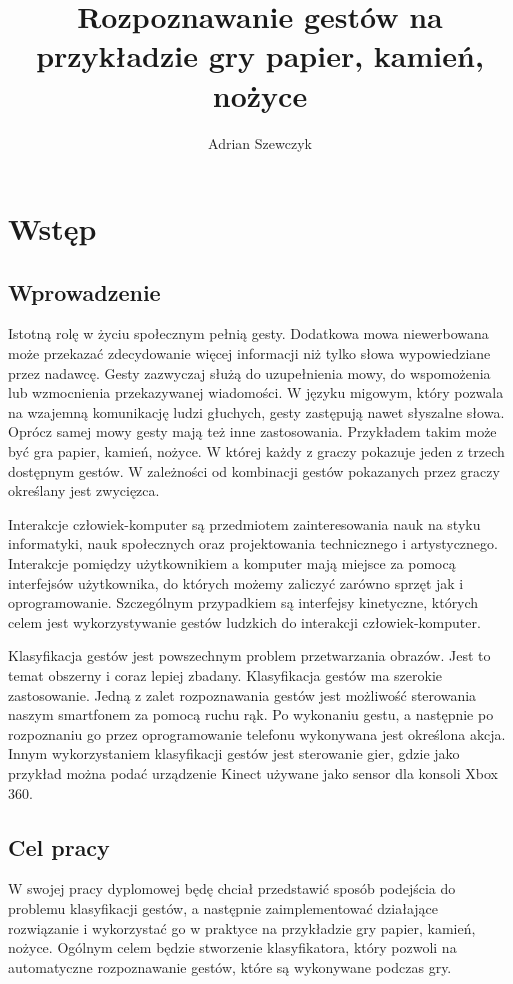\documentclass[a4paper,12pt,twoside,openany]{report}
\title{Rozpoznawanie gestów na przykładzie gry papier, kamień, nożyce}
\author{Adrian Szewczyk}
\begin{document}
\maketitle


\chapter{Wstęp}
\section{Wprowadzenie}
Istotną rolę w życiu społecznym pełnią gesty. Dodatkowa mowa niewerbowana może przekazać zdecydowanie więcej informacji niż tylko słowa wypowiedziane przez nadawcę. Gesty zazwyczaj służą do uzupełnienia mowy, do wspomożenia lub wzmocnienia przekazywanej wiadomości\cite{Collins}. W języku migowym, który pozwala na wzajemną komunikację ludzi głuchych, gesty zastępują nawet słyszalne słowa. Oprócz samej mowy gesty mają też inne zastosowania. Przykładem takim może być gra papier, kamień, nożyce. W której każdy z graczy pokazuje jeden z trzech dostępnym gestów. W zależności od kombinacji gestów pokazanych przez graczy określany jest zwycięzca.

Interakcje człowiek-komputer są przedmiotem zainteresowania nauk na styku informatyki, nauk społecznych oraz projektowania technicznego i artystycznego. Interakcje pomiędzy użytkownikiem a komputer mają miejsce za pomocą interfejsów użytkownika, do których możemy zaliczyć zarówno sprzęt jak i oprogramowanie\cite{Kostkiewicz}. Szczególnym przypadkiem są interfejsy kinetyczne, których celem jest wykorzystywanie gestów ludzkich do interakcji człowiek-komputer.

Klasyfikacja gestów jest powszechnym problem przetwarzania obrazów. Jest to temat obszerny i coraz lepiej zbadany. Klasyfikacja gestów ma szerokie zastosowanie. Jedną z zalet rozpoznawania gestów jest możliwość sterowania naszym smartfonem za pomocą ruchu rąk. Po wykonaniu gestu, a następnie po rozpoznaniu go przez  oprogramowanie telefonu wykonywana jest określona akcja. Innym wykorzystaniem klasyfikacji gestów jest sterowanie gier, gdzie jako przykład można podać urządzenie Kinect używane jako sensor dla konsoli Xbox 360\cite{Kinect}.

\section{Cel pracy}
W swojej pracy dyplomowej będę chciał przedstawić sposób podejścia do problemu klasyfikacji gestów, a następnie zaimplementować działające rozwiązanie i wykorzystać go w praktyce na przykładzie gry papier, kamień, nożyce. Ogólnym celem będzie stworzenie klasyfikatora, który pozwoli na automatyczne rozpoznawanie gestów, które są wykonywane podczas gry.
\end{document}
